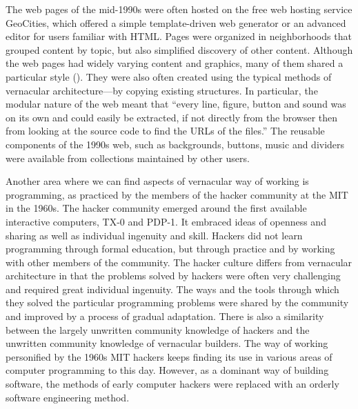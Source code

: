The web pages of the mid-1990s were often hosted on the free web hosting service GeoCities, which
offered a simple template-driven web generator or an advanced editor for users familiar with HTML.
Pages were organized in neighborhoods that grouped content by topic, but also simplified discovery
of other content. Although the web pages had widely varying content and
graphics, many of them shared a particular style (). They were also
often created using the typical methods of vernacular architecture---by copying existing structures.
In particular, the modular nature of the web meant that ``every line, figure, button and sound was
on its own and could easily be extracted, if not directly from the browser then from looking at the
source code to find the URLs of the files.'' The reusable components of the
1990s web, such as backgrounds, buttons, music and dividers were available from collections
maintained by other users.

Another area where we can find aspects of vernacular way of working is programming, as practiced
by the members of the hacker community at the MIT in the 1960s. The hacker community emerged around
the first available interactive computers, TX-0 and PDP-1. It embraced ideas of openness and
sharing as well as individual ingenuity and skill. Hackers did not learn programming
through formal education, but through practice and by working with other members of the community.
The hacker culture differs from vernacular architecture in that the problems solved by hackers
were often very challenging and required great individual ingenuity. The ways and the tools
through which they solved the particular programming problems were shared by the community
and improved by a process of gradual adaptation. There is also a
similarity between the largely unwritten community knowledge of hackers
and the unwritten community knowledge of vernacular builders. The way of working
personified by the 1960s MIT hackers keeps finding its use in various areas of computer programming
to this day. However, as a dominant way of building software, the methods of early computer hackers
were replaced with an orderly software engineering method.


